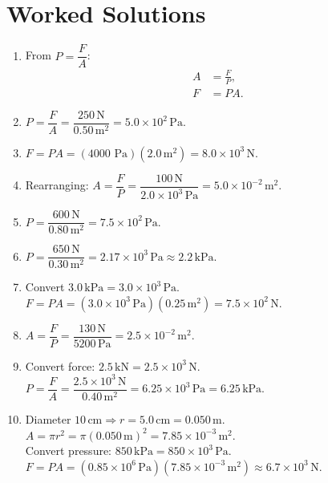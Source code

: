 \documentclass[12pt]{article}
\begin{document}
\section*{Worked Solutions}
\begin{enumerate}
\item From \(P = \dfrac{F}{A}\):
    \begin{align*}
    A &= \frac{F}{P},\\[4pt]
    F &= P A.
    \end{align*}

\item \(P = \dfrac{F}{A} = \dfrac{250\,\text{N}}{0.50\,\text{m}^2} = 5.0 \times 10^{2}\,\text{Pa}.\)

\item \(F = P A = (4000\text{ Pa})(2.0\,\text{m}^2) = 8.0 \times 10^{3}\,\text{N}.\)

\item Rearranging: \(A = \dfrac{F}{P} = \dfrac{100\,\text{N}}{2.0 \times 10^{3}\,\text{Pa}} = 5.0 \times 10^{-2}\,\text{m}^2.\)

\item \(P = \dfrac{600\,\text{N}}{0.80\,\text{m}^2} = 7.5 \times 10^{2}\,\text{Pa}.\)

\item \(P = \dfrac{650\,\text{N}}{0.30\,\text{m}^2} = 2.17 \times 10^{3}\,\text{Pa} \approx 2.2\,\text{kPa}.\)

\item Convert \(3.0\,\text{kPa} = 3.0 \times 10^{3}\,\text{Pa}\).\\
\(F = P A = (3.0 \times 10^{3}\,\text{Pa})(0.25\,\text{m}^2) = 7.5 \times 10^{2}\,\text{N}.\)

\item \(A = \dfrac{F}{P} = \dfrac{130\,\text{N}}{5200\,\text{Pa}} = 2.5 \times 10^{-2}\,\text{m}^2.\)

\item Convert force: \(2.5\,\text{kN} = 2.5 \times 10^{3}\,\text{N}\).\\
\(P = \dfrac{F}{A} = \dfrac{2.5 \times 10^{3}\,\text{N}}{0.40\,\text{m}^2} = 6.25 \times 10^{3}\,\text{Pa} = 6.25\,\text{kPa}.\)

\item Diameter \(10\,\text{cm} \Rightarrow r = 5.0\,\text{cm} = 0.050\,\text{m}\).\\
\(A = \pi r^{2} = \pi(0.050\,\text{m})^{2} = 7.85 \times 10^{-3}\,\text{m}^2.\)\\
Convert pressure: \(850\,\text{kPa} = 850 \times 10^{3}\,\text{Pa}\).\\
\(F = P A = (0.85 \times 10^{6}\,\text{Pa})(7.85 \times 10^{-3}\,\text{m}^2) \approx 6.7 \times 10^{3}\,\text{N}.\)


\end{enumerate}
\end{document}
